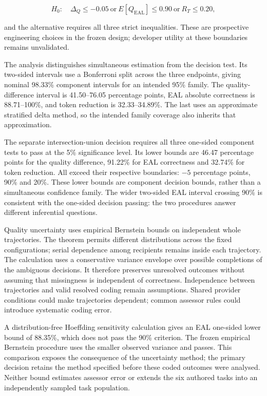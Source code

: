 \documentclass[
  11pt,
]{article}
\begin{document}
\[
H_0:\quad \Delta_Q\leq-0.05\ \text{or}\ E[Q_{\mathrm{EAL}}]\leq0.90\ \text{or}\ R_T\leq0.20,
\]

and the alternative requires all three strict inequalities. These are
prospective engineering choices in the frozen design; developer utility
at these boundaries remains unvalidated.

The analysis distinguishes simultaneous estimation from the decision
test. Its two-sided intervals use a Bonferroni split across the three
endpoints, giving nominal 98.33\% component intervals for an intended
95\% family. The quality-difference interval is 41.50--76.05 percentage
points, EAL absolute correctness is 88.71--100\%, and token reduction is
32.33--34.89\%. The last uses an approximate stratified delta method, so
the intended family coverage also inherits that approximation.

The separate intersection-union decision requires all three one-sided
component tests to pass at the 5\% significance level. Its lower bounds
are 46.47 percentage points for the quality difference, 91.22\% for EAL
correctness and 32.74\% for token reduction. All exceed their respective
boundaries: \(-5\) percentage points, 90\% and 20\%. These lower bounds
are component decision bounds, rather than a simultaneous confidence
family. The wider two-sided EAL interval crossing 90\% is consistent
with the one-sided decision passing: the two procedures answer different
inferential questions.

Quality uncertainty uses empirical Bernstein bounds on independent whole
trajectories. The theorem permits different distributions across the
fixed configurations; serial dependence among recipients remains inside
each trajectory. The calculation uses a conservative variance envelope
over possible completions of the ambiguous decisions. It therefore
preserves unresolved outcomes without assuming that missingness is
independent of correctness. Independence between trajectories and valid
resolved coding remain assumptions. Shared provider conditions could
make trajectories dependent; common assessor rules could introduce
systematic coding error.

A distribution-free Hoeffding sensitivity calculation gives an EAL
one-sided lower bound of 88.35\%, which does not pass the 90\%
criterion. The frozen empirical Bernstein procedure uses the smaller
observed variance and passes. This comparison exposes the consequence of
the uncertainty method; the primary decision retains the method
specified before these coded outcomes were analysed. Neither bound
estimates assessor error or extends the six authored tasks into an
independently sampled task population.
\end{document}
